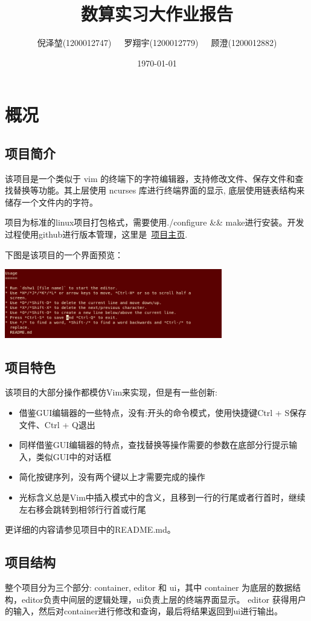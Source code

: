 \documentclass[a4paper,9pt]{article}
\title{\textbf{数算实习大作业报告}}
\author{\small{倪泽堃(1200012747)\ \ \ 罗翔宇(1200012779)\ \ \ 顾澄(1200012882)}}
\date{\today}
\begin{document}
\maketitle
\section{概况}
\subsection{项目简介}
该项目是一个类似于 vim 的终端下的字符编辑器，支持修改文件、保存文件和查找替换等功能。其上层使用 ncurses 库进行终端界面的显示, 底层使用链表结构来储存一个文件内的字符。

项目为标准的linux项目打包格式，需要使用./configure \&\& make进行安装。开发过程使用github进行版本管理，这里是\ \href{https://github.com/MelodiaDev/dshw1}{\color{blue}项目主页}.

下图是该项目的一个界面预览：

\begin{center}
	\includegraphics[height=3cm]{overview.png}
\end{center}

\subsection{项目特色}
该项目的大部分操作都模仿Vim来实现，但是有一些创新:
\begin{itemize}
	\item{} 借鉴GUI编辑器的一些特点，没有:开头的命令模式，使用快捷键Ctrl + S保存文件、Ctrl + Q退出
	\item{} 同样借鉴GUI编辑器的特点，查找替换等操作需要的参数在底部分行提示输入，类似GUI中的对话框
	\item{} 简化按键序列，没有两个键以上才需要完成的操作
	\item{} 光标含义总是Vim中插入模式中的含义，且移到一行的行尾或者行首时，继续左右移会跳转到相邻行行首或行尾
\end{itemize}
更详细的内容请参见项目中的README.md。

\subsection{项目结构}
整个项目分为三个部分: container, editor 和 ui，其中 container 为底层的数据结构，editor负责中间层的逻辑处理，ui负责上层的终端界面显示。
editor 获得用户的输入，然后对container进行修改和查询，最后将结果返回到ui进行输出。
\end{document}

